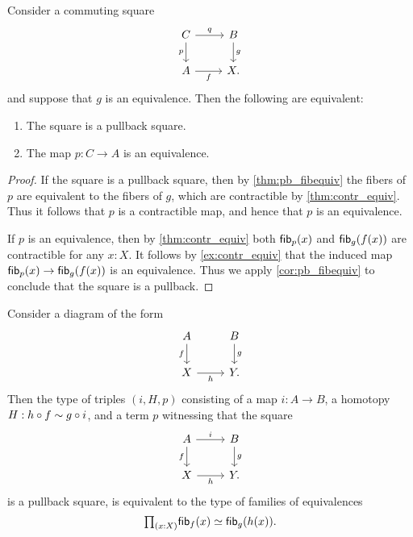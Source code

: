 \begin{cor}\label{cor:pb_equiv}
Consider a commuting square
\begin{equation*}
\begin{tikzcd}
C \arrow[r,"q"] \arrow[d,swap,"p"] & B \arrow[d,"g"] \\
A \arrow[r,swap,"f"] & X.
\end{tikzcd}
\end{equation*}
and suppose that $g$ is an equivalence. Then the following are equivalent:
\begin{enumerate}
\item The square is a pullback square.
\item The map $p:C\to A$ is an equivalence.
\end{enumerate}
\end{cor}

\begin{proof}
If the square is a pullback square, then by \cref{thm:pb_fibequiv} the fibers of $p$ are equivalent to the fibers of $g$, which are contractible by \cref{thm:contr_equiv}. Thus it follows that $p$ is a contractible map, and hence that $p$ is an equivalence.

If $p$ is an equivalence, then by \cref{thm:contr_equiv} both $\mathsf{fib}_{p}(x)$ and $\mathsf{fib}_{g}(f(x))$ are contractible for any $x:X$. It follows by \cref{ex:contr_equiv} that the induced map $\mathsf{fib}_{p}(x)\to\mathsf{fib}_{g}(f(x))$ is an equivalence. Thus we apply \cref{cor:pb_fibequiv} to conclude that the square is a pullback.
\end{proof}

\begin{thm}\label{thm:pb_fibequiv_complete}
Consider a diagram of the form
\begin{equation*}
\begin{tikzcd}
A \arrow[d,swap,"f"] & B \arrow[d,"g"] \\
X \arrow[r,swap,"h"] & Y.
\end{tikzcd}
\end{equation*}
Then the type of triples $(i,H,p)$ consisting of a map $i:A\to B$, a homotopy $H:h\circ f\sim g\circ i$, and a term $p$ witnessing that the square
\begin{equation*}
\begin{tikzcd}
A \arrow[d,swap,"f"] \arrow[r,"i"] & B \arrow[d,"g"] \\
X \arrow[r,swap,"h"] & Y.
\end{tikzcd}
\end{equation*}
is a pullback square, is equivalent to the type of families of equivalences
\begin{equation*}
\prd{x:X}\eqv{\fib{f}{x}}{\fib{g}{h(x)}}.
\end{equation*}
\end{thm}

